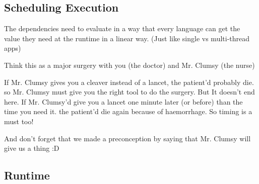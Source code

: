 \documentclass[11pt]{article}
\begin{document}
\subsection{Scheduling Execution}
\label{sec:org4ca2343}

The dependencies need to evaluate in a way that every language can get the value they need at the runtime in a linear way. (Just like single vs multi-thread apps)

Think this as a major surgery with you (the doctor) and Mr. Clumsy (the nurse)

If Mr. Clumsy gives you a cleaver instead of a lancet, the patient'd probably die.
so Mr. Clumsy must give you the right tool to do the surgery. But It doesn't end here.
If Mr. Clumsy'd give you a lancet one minute later (or before) than the time you need it.
the patient'd die again because of haemorrhage. So timing is a must too!

And don't forget that we made a preconception by saying that Mr. Clumsy will give us a thing :D


\subsection{Runtime}
\label{sec:orgf421e81}
\end{document}
